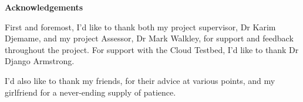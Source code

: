 \begin{center}
    {\LARGE\bf Acknowledgements}
\end{center}

First and foremost, I'd like to thank both my project supervisor, Dr Karim Djemame, and my project Assessor, Dr Mark Walkley, for support and feedback throughout the project. For support with the Cloud Testbed, I'd like to thank Dr Django Armstrong.

I'd also like to thank my friends, for their advice at various points, and my girlfriend for a never-ending supply of patience. 